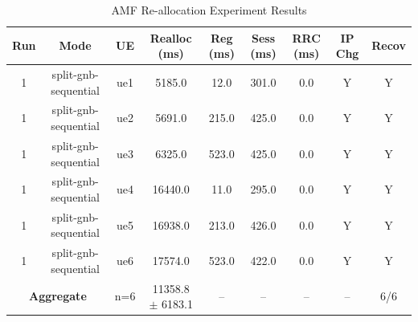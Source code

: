 \begin{table}[ht]
\centering
\begin{tabular}{|c|c|c|c|c|c|c|c|c|}
\hline
Run & Mode & UE & Realloc (ms) & Reg (ms) & Sess (ms) & RRC (ms) & IP Chg & Recov \\
\hline
1 & split-gnb-sequential & ue1 & 5185.0 & 12.0 & 301.0 & 0.0 & Y & Y \\
1 & split-gnb-sequential & ue2 & 5691.0 & 215.0 & 425.0 & 0.0 & Y & Y \\
1 & split-gnb-sequential & ue3 & 6325.0 & 523.0 & 425.0 & 0.0 & Y & Y \\
1 & split-gnb-sequential & ue4 & 16440.0 & 11.0 & 295.0 & 0.0 & Y & Y \\
1 & split-gnb-sequential & ue5 & 16938.0 & 213.0 & 426.0 & 0.0 & Y & Y \\
1 & split-gnb-sequential & ue6 & 17574.0 & 523.0 & 422.0 & 0.0 & Y & Y \\
\multicolumn{2}{|c|}{\textbf{Aggregate}} & n=6 & 11358.8 $\pm$ 6183.1 & -- & -- & -- & -- & 6/6 \\
\hline
\end{tabular}
\caption{AMF Re-allocation Experiment Results}
\label{tab:amf_realloc}
\end{table}

